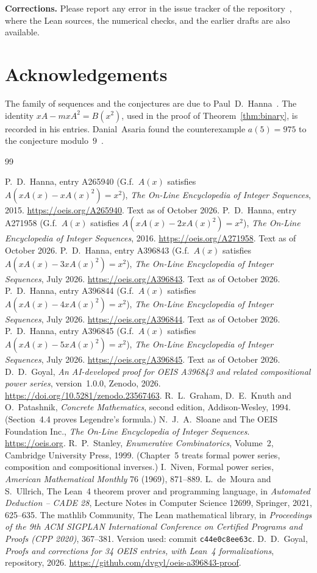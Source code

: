 \documentclass[11pt,a4paper]{article}
\theoremstyle{definition}
\theoremstyle{remark}
\newcommand{\para}[1]{\par\medskip\noindent\textbf{#1}\enspace}
\begin{document}
\para{Corrections.} Please report any error in the issue tracker of the repository~\cite{repo}, where the Lean
sources, the numerical checks, and the earlier drafts are also available.

\section*{Acknowledgements}
The family of sequences and the conjectures are due to Paul~D.~Hanna~\cite{oeis1,oeis2,oeis3,oeis4,oeis5}. The identity
$xA-mxA^2=B(x^2)$, used in the proof of Theorem~\ref{thm:binary}, is recorded in his entries. Danial~Asaria found the counterexample $a(5)=975$ to the conjecture modulo~$9$~\cite{oeis3}.

\begin{thebibliography}{99}\small
\raggedright
{} P.~D.~Hanna, entry A265940 (G.f.\ $A(x)$ satisfies $A(xA(x)-xA(x)^2)=x^2$), \emph{The On-Line Encyclopedia of Integer Sequences}, 2015. \url{https://oeis.org/A265940}. Text as of October 2026.
 P.~D.~Hanna, entry A271958 (G.f.\ $A(x)$ satisfies $A(xA(x)-2xA(x)^2)=x^2$), \emph{The On-Line Encyclopedia of Integer Sequences}, 2016. \url{https://oeis.org/A271958}. Text as of October 2026.
 P.~D.~Hanna, entry A396843 (G.f.\ $A(x)$ satisfies $A(xA(x)-3xA(x)^2)=x^2$), \emph{The On-Line Encyclopedia of Integer Sequences}, July 2026. \url{https://oeis.org/A396843}. Text as of October 2026.
 P.~D.~Hanna, entry A396844 (G.f.\ $A(x)$ satisfies $A(xA(x)-4xA(x)^2)=x^2$), \emph{The On-Line Encyclopedia of Integer Sequences}, July 2026. \url{https://oeis.org/A396844}. Text as of October 2026.
 P.~D.~Hanna, entry A396845 (G.f.\ $A(x)$ satisfies $A(xA(x)-5xA(x)^2)=x^2$), \emph{The On-Line Encyclopedia of Integer Sequences}, July 2026. \url{https://oeis.org/A396845}. Text as of October 2026.
 D.~D.~Goyal, \emph{An AI-developed proof for OEIS A396843 and related compositional power series}, version~1.0.0, Zenodo, 2026. \url{https://doi.org/10.5281/zenodo.23567463}.
 R.~L.~Graham, D.~E.~Knuth and O.~Patashnik, \emph{Concrete Mathematics}, second edition, Addison-Wesley, 1994. (Section~4.4 proves Legendre's formula.)
 N.~J.~A.~Sloane and The OEIS Foundation Inc., \emph{The On-Line Encyclopedia of Integer Sequences}. \url{https://oeis.org}.
 R.~P.~Stanley, \emph{Enumerative Combinatorics}, Volume~2, Cambridge University Press, 1999. (Chapter~5 treats formal power series, composition and compositional inverses.)
 I.~Niven, Formal power series, \emph{American Mathematical Monthly} 76 (1969), 871--889.
 L.~de~Moura and S.~Ullrich, The Lean~4 theorem prover and programming language, in \emph{Automated Deduction -- CADE 28}, Lecture Notes in Computer Science 12699, Springer, 2021, 625--635.
 The mathlib Community, The Lean mathematical library, in \emph{Proceedings of the 9th ACM SIGPLAN International Conference on Certified Programs and Proofs (CPP 2020)}, 367--381. Version used: commit \texttt{c44e0c8ee63c}.
 D.~D.~Goyal, \emph{Proofs and corrections for 34 OEIS entries, with Lean~4 formalizations}, repository, 2026. \url{https://github.com/dvgyl/oeis-a396843-proof}.
\end{thebibliography}
\end{document}
